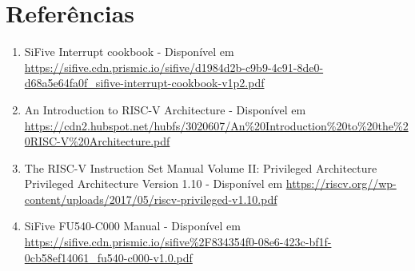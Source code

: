\documentclass{article}
\begin{document}
\section{Referências}

\begin{enumerate}
 \item SiFive Interrupt cookbook - Disponível em \url{https://sifive.cdn.prismic.io/sifive/d1984d2b-c9b9-4c91-8de0-d68a5e64fa0f_sifive-interrupt-cookbook-v1p2.pdf}
 \item An Introduction to RISC-V Architecture - Disponível em \url{https://cdn2.hubspot.net/hubfs/3020607/An%20Introduction%20to%20the%20RISC-V%20Architecture.pdf}
 \item The RISC-V Instruction Set Manual Volume II: Privileged Architecture Privileged Architecture Version 1.10 - Disponível em \url{https://riscv.org//wp-content/uploads/2017/05/riscv-privileged-v1.10.pdf}
 \item SiFive FU540-C000 Manual - Disponível em \url{https://sifive.cdn.prismic.io/sifive%2F834354f0-08e6-423c-bf1f-0cb58ef14061_fu540-c000-v1.0.pdf}
\end{enumerate}
\end{document}
